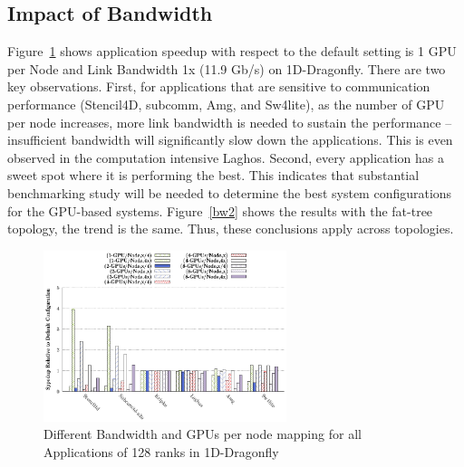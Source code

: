 \documentclass[conference]{IEEEtran}
\begin{document}
%

\subsection{Impact of Bandwidth}

Figure~\ref{bw1} shows application speedup with respect to the default setting is 1 GPU
per Node and Link Bandwidth 1x (11.9 Gb/s) on 1D-Dragonfly.  
There are two key observations. First, for applications that are sensitive to communication
performance (Stencil4D, subcomm, Amg, and Sw4lite), as the number of GPU per node
increases, more link bandwidth is needed to sustain the performance -- insufficient bandwidth
will significantly slow down the applications. This is even observed in the computation
intensive Laghos. Second, every application has a sweet spot where it is performing the
best. This indicates that substantial benchmarking study will be needed to determine the
best system configurations for the GPU-based systems. Figure~\ref{bw2} shows the results with
the fat-tree topology, the trend is the same. Thus, these conclusions apply across
topologies. 

\begin{figure}[H]
\centering
\centering
\includegraphics[width=1\linewidth, height=5cm]{figs/dfly-bw-mapping-all.eps}
\vspace{-0.15in}
\caption{Different Bandwidth and GPUs per node mapping for all Applications of 128 ranks in 1D-Dragonfly}
\label{bw1}
\end{figure}
\end{document}
